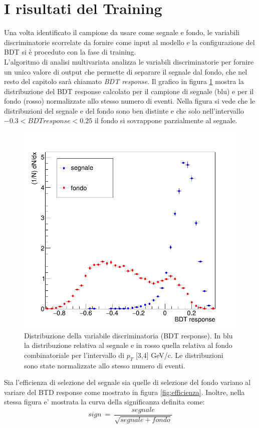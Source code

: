 \section{I risultati del Training}
Una volta identificato il campione da usare come segnale e fondo, le variabili discriminatorie scorrelate da fornire come input al modello e la configurazione del BDT si è proceduto con la fase di training. 
\\L'algoritmo di analisi multivariata analizza le variabili discriminatorie per fornire un unico valore di output che permette di separare il segnale dal fondo, che nel resto del capitolo sarà chiamato \textit{BDT response}. Il grafico in figura \ref{fig:BDTresponse} mostra la distribuzione del BDT response calcolato per il campione di segnale (blu) e per il fondo (rosso) normalizzate allo stesso numero di eventi. Nella figura si vede che le distribuzioni del segnale e del fondo sono ben distinte e che solo nell'intervallo $-0.3 < BDT response < 0.25$ il fondo si sovrappone parzialmente al segnale. 
    \begin{figure}[htbp] 
        \centering
        \includegraphics[width=0.7\linewidth]{training&testing/distribuzioneBDT_test.png}
        \caption{Distribuzione della variabile discriminatoria (BDT response). In blu la distribuzione relativa al segnale e in rosso quella relativa al fondo combinatoriale per l'intervallo di $p_T$ [3,4] GeV/c. Le distribuzioni sono state normalizzate allo stesso numero di eventi.} 
        \label{fig:BDTresponse}
    \end{figure}
    
    
Sia l'efficienza di selezione del segnale sia quelle di selezione del fondo variano al variare del BTD response come mostrato in figura \ref{fig:efficienza}. Inoltre, nella stessa figura e' mostrata la curva della significanza definita come:
    \begin{equation}
        sign \ = \ \frac{segnale}{\sqrt{segnale + fondo}}
    \end{equation}

